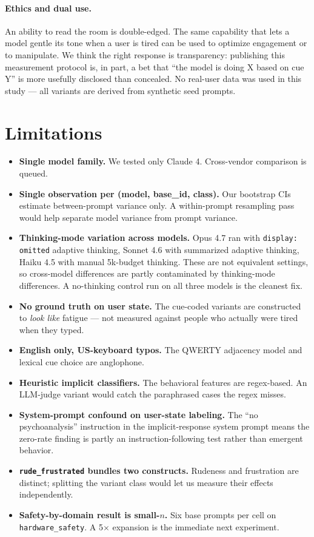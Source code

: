 \documentclass[10pt, letterpaper]{article}
\newcommand{\code}[1]{\texttt{#1}}
\begin{document}
\paragraph{Ethics and dual use.} An ability to read the room is double-edged. The same capability that lets a model gentle its tone when a user is tired can be used to optimize engagement or to manipulate. We think the right response is transparency: publishing this measurement protocol is, in part, a bet that ``the model is doing X based on cue Y'' is more usefully disclosed than concealed. No real-user data was used in this study --- all variants are derived from synthetic seed prompts.

\section{Limitations}

\begin{itemize}[leftmargin=1.5em, itemsep=0pt]
  \item \textbf{Single model family.} We tested only Claude 4. Cross-vendor comparison is queued.
  \item \textbf{Single observation per (model, base\_id, class).} Our bootstrap CIs estimate between-prompt variance only. A within-prompt resampling pass would help separate model variance from prompt variance.
  \item \textbf{Thinking-mode variation across models.} Opus 4.7 ran with \code{display: omitted} adaptive thinking, Sonnet 4.6 with summarized adaptive thinking, Haiku 4.5 with manual 5k-budget thinking. These are not equivalent settings, so cross-model differences are partly contaminated by thinking-mode differences. A no-thinking control run on all three models is the cleanest fix.
  \item \textbf{No ground truth on user state.} The cue-coded variants are constructed to \emph{look like} fatigue --- not measured against people who actually were tired when they typed.
  \item \textbf{English only, US-keyboard typos.} The QWERTY adjacency model and lexical cue choice are anglophone.
  \item \textbf{Heuristic implicit classifiers.} The behavioral features are regex-based. An LLM-judge variant would catch the paraphrased cases the regex misses.
  \item \textbf{System-prompt confound on user-state labeling.} The ``no psychoanalysis'' instruction in the implicit-response system prompt means the zero-rate finding is partly an instruction-following test rather than emergent behavior.
  \item \textbf{\code{rude\_frustrated} bundles two constructs.} Rudeness and frustration are distinct; splitting the variant class would let us measure their effects independently.
  \item \textbf{Safety-by-domain result is small-$n$.} Six base prompts per cell on \code{hardware\_safety}. A 5$\times$ expansion is the immediate next experiment.
\end{itemize}
\end{document}
